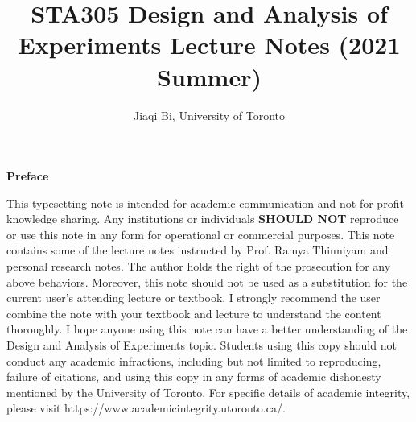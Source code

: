 \documentclass[a4paper,11pt]{article}
\title{\textbf{STA305 Design and Analysis of Experiments Lecture Notes (2021 Summer)}}
\author{Jiaqi Bi, University of Toronto}
\begin{document}

\begin{titlepage}
\end{titlepage}

\maketitle

\newpage

\begin{Large}
\noindent \textbf{Preface}
\end{Large}

\vspace{6pt}

\noindent This typesetting note is intended for academic communication and not-for-profit knowledge sharing. Any institutions or individuals \textbf{SHOULD NOT} reproduce or use this note in any form for operational or commercial purposes. This note contains some of the lecture notes instructed by Prof. Ramya Thinniyam and personal research notes. The author holds the right of the prosecution for any above behaviors. Moreover, this note should not be used as a substitution for the current user's attending lecture or textbook. I strongly recommend the user combine the note with your textbook and lecture to understand the content thoroughly. I hope anyone using this note can have a better understanding of the Design and Analysis of Experiments topic. Students using this copy should not conduct any academic infractions, including but not limited to reproducing, failure of citations, and using this copy in any forms of academic dishonesty mentioned by the University of Toronto. For specific details of academic integrity, please visit https://www.academicintegrity.utoronto.ca/. 

\doclicenseThis
\end{document}

